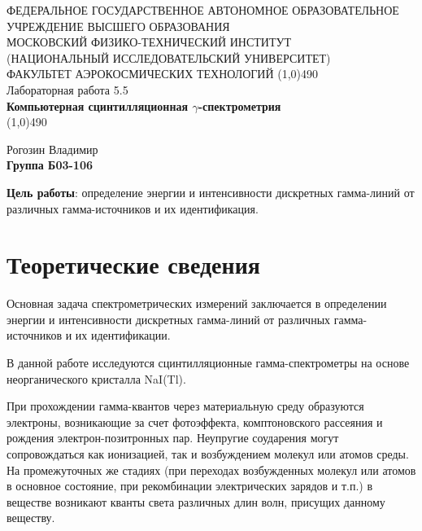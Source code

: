 \documentclass[a4paper,12pt]{article}
\begin{document}
\begin{titlepage}
\begin{center}
\large{\small ФЕДЕРАЛЬНОЕ ГОСУДАРСТВЕННОЕ АВТОНОМНОЕ ОБРАЗОВАТЕЛЬНОЕ\\ УЧРЕЖДЕНИЕ ВЫСШЕГО ОБРАЗОВАНИЯ \\ МОСКОВСКИЙ ФИЗИКО-ТЕХНИЧЕСКИЙ ИНСТИТУТ\\ (НАЦИОНАЛЬНЫЙ ИССЛЕДОВАТЕЛЬСКИЙ УНИВЕРСИТЕТ)\\ ФАКУЛЬТЕТ АЭРОКОСМИЧЕСКИХ ТЕХНОЛОГИЙ}
\vfill
\line(1,0){490}\\[1mm]
\huge{Лабораторная работа 5.5}\\
\huge\textbf{Компьютерная сцинтилляционная $\gamma$-спектрометрия}\\
\line(1,0){490}\\[1mm]
\vfill
\begin{flushright}
\normalsize{Рогозин Владимир}\\
\normalsize{\textbf{Группа Б03-106}}\\
\end{flushright}
\end{center}
\end{titlepage}

\textbf{Цель работы}:
определение энергии и интенсивности дискретных гамма-линий от различных гамма-источников и их идентификация.




\section{Теоретические сведения}
Основная задача спектрометрических измерений заключается в определении энергии и интенсивности дискретных гамма-линий от различных гамма-источников и их идентификации.

В данной работе исследуются сцинтилляционные гамма-спектрометры на
основе неорганического кристалла NaI(Tl).

При прохождении гамма-квантов через материальную среду образуются электроны, возникающие за счет фотоэффекта, комптоновского рассеяния и рождения электрон-позитронных пар. Неупругие соударения могут сопровождаться как ионизацией, так и
возбуждением молекул или атомов среды. На промежуточных же стадиях (при переходах возбужденных молекул или атомов в основное состояние, при рекомбинации электрических зарядов и т.п.) в веществе возникают кванты света различных длин волн, присущих данному веществу.
\end{document}
